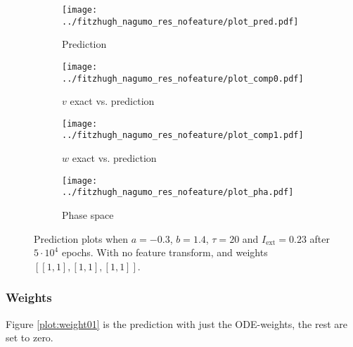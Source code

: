 \documentclass[a4paper]{article}
\begin{document}
\begin{figure}[H]
	\centering 
	\begin{subfigure}[b]{0.47\textwidth}
		\centering
		\texttt{[image: ../fitzhugh\_nagumo\_res\_nofeature/plot\_pred.pdf]}
		\caption{Prediction}
		\label{fig:all06a}
	\end{subfigure}
	\begin{subfigure}[b]{0.47\textwidth}
		\centering
		\texttt{[image: ../fitzhugh\_nagumo\_res\_nofeature/plot\_comp0.pdf]}
		\caption{$v$ exact vs. prediction}
		\label{fig:all06b}
	\end{subfigure}
	\begin{subfigure}[b]{0.47\textwidth}
		\centering
		\texttt{[image: ../fitzhugh\_nagumo\_res\_nofeature/plot\_comp1.pdf]}
		\caption{$w$ exact vs. prediction}
		\label{fig:all06c}
	\end{subfigure}
	\begin{subfigure}[b]{0.47\textwidth}
		\centering
		\texttt{[image: ../fitzhugh\_nagumo\_res\_nofeature/plot\_pha.pdf]}
		\caption{Phase space}
		\label{fig:all06d}
	\end{subfigure}
	\caption{Prediction plots when $a=-0.3$, $b=1.4$, $\tau=20$ and $ I_{\text{ext}}=0.23$ after $5\cdot10^4$ epochs. With no feature transform, and weights $\left[ \left[ 1, 1\right], \left[ 1, 1\right], \left[ 1, 1\right]\right]$.}
	\label{plot:all06}
\end{figure}



\subsubsection{Weights}

Figure \ref{plot:weight01} is the prediction with just the ODE-weights, the rest are set to zero.
\end{document}
